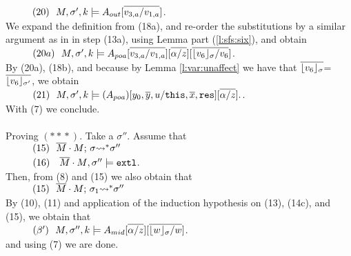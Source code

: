 \begin{description}
$\SPS (20) \ \  \satDAssertFrom M  {\sigma'} {k}   {\Aout[\overline{v_{3,a}/v_{1,a}}]}$.
\\
We expand the definition from (18a), and re-order the substitutions by a similar argument as in in step (13a), using Lemma    part (\ref{l:sfs:six}), and obtain\\
$\SPS (20a) \ \  \satDAssertFrom M  {\sigma'} {k}   {\Apoa[\overline{v_{3,a}/v_{1,a}}][\overline{\alpha/z}][\overline{\interpret {\sigma} {v_6} /v_6}]}$.
\\
By  (20a),   (18b),  and because  by Lemma \ref{l:var:unaffect} we have that $\overline{\interpret {\sigma} {v_6}}$=$\overline{\interpret {\sigma'} {v_6}}$, we  obtain
\\
$\SPS (21) \ \ \satDAssertFrom M  {\sigma'} {k}   {(\Apoa)[y_0,\overline y, u/\prg{this},\overline x, \prg{res}][\overline{\alpha/z}]}. $. 
\\
With (7) we conclude.\\
~ \\



 \vspace{.3cm}
Proving $(*\!*\!*)$. Take a $\sigma''$. Assume that\\
$\SPS (15) \ \ \leadstoBoundedStar   {\Mtwo\cdot M}  {\sigma}  {\sigma''}$\\
$\SPS (16) \ \ \ {\Mtwo\cdot M}, \sigma'' \models \extThis$.\\
Then, from (8) and (15) we also obtain that\\
$\SPS (15) \ \ \leadstoBoundedStar   {\Mtwo\cdot M}  {\sigma_1}  {\sigma''}$\\
By (10), (11) and application of the induction hypothesis on (13),  (14c), and (15), we obtain that\\
$\SPS (\beta') \ \  \satDAssertFrom M  {\sigma''} {k}   {A_{mid}[\overline{\alpha/z}][\overline{\interpret \sigma {w}/w}]}$.\\
and using (7) we are done.
\\
~ \\




\end{description}
